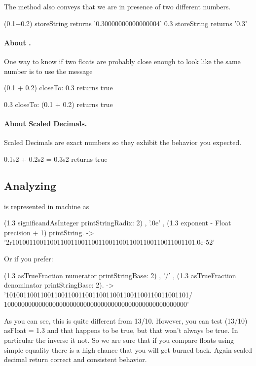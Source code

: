 \documentclass[a4paper,10pt,twoside]{book}
\begin{document}
	
The method  also conveys that we are in presence of two different numbers.
		
\begin{code}{}
(0.1+0.2) storeString 
	returns 	'0.30000000000000004' 
0.3 storeString 
	returns	'0.3'
\end{code}	
		
\paragraph{About .} One way to know if two floats are probably close enough to look like the same number is to use the message 

\begin{code}{}
(0.1 + 0.2) closeTo: 0.3
	returns true

0.3 closeTo: (0.1 + 0.2)
	returns true
\end{code}		
		
		
\paragraph{About Scaled Decimals.}
Scaled Decimals are exact numbers so they exhibit the behavior you expected.

\begin{code}{}
0.1s2 + 0.2s2 = 0.3s2
	returns true
\end{code}		
		

\subsection{Analyzing }
 is represented in machine as

\begin{code}{}
(1.3 significandAsInteger printStringRadix: 2) , '.0e' , (1.3 exponent
- Float precision + 1) printString.
-> '2r10100110011001100110011001100110011001100110011001101.0e-52'
\end{code}

Or if you prefer:

\begin{code}{}
(1.3 asTrueFraction numerator printStringBase: 2) , '/' , (1.3
asTrueFraction denominator printStringBase: 2).
-> '10100110011001100110011001100110011001100110011001101/
10000000000000000000000000000000000000000000000000000'
\end{code}

As you can see, this is quite different from 13/10. However, you can test (13/10) asFloat = 1.3 and that happens to be true, but that won't always be true. In particular the inverse it not. So we are sure that if you compare floats using simple equality there is a high chance that you will get burned back. Again scaled decimal return correct and consistent behavior.
\end{document}

